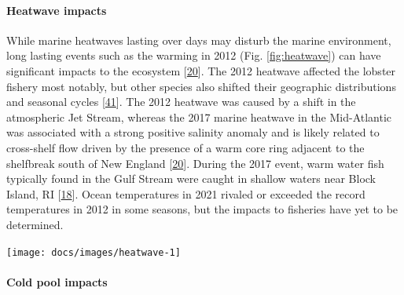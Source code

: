 \documentclass[
  10pt,
]{article}
\let\origfigure\figure
\let\endorigfigure\endfigure
\renewenvironment{figure}[1][2] {
    \expandafter\origfigure\expandafter[H]
} {
    \endorigfigure
}
\begin{document}
\hypertarget{heatwave-impacts}{%
\paragraph{Heatwave impacts}\label{heatwave-impacts}}

While marine heatwaves lasting over days may disturb the marine
environment, long lasting events such as the warming in 2012 (Fig.
\ref{fig:heatwave}) can have significant impacts to the ecosystem
{[}\protect\hyperlink{ref-gawarkiewicz_characteristics_2019}{20}{]}. The
2012 heatwave affected the lobster fishery most notably, but other
species also shifted their geographic distributions and seasonal cycles
{[}\protect\hyperlink{ref-mills_fisheries_2013}{41}{]}. The 2012
heatwave was caused by a shift in the atmospheric Jet Stream, whereas
the 2017 marine heatwave in the Mid-Atlantic was associated with a
strong positive salinity anomaly and is likely related to cross-shelf
flow driven by the presence of a warm core ring adjacent to the
shelfbreak south of New England
{[}\protect\hyperlink{ref-gawarkiewicz_characteristics_2019}{20}{]}.
During the 2017 event, warm water fish typically found in the Gulf
Stream were caught in shallow waters near Block Island, RI
{[}\protect\hyperlink{ref-gawarkiewicz_changing_2018}{18}{]}. Ocean
temperatures in 2021 rivaled or exceeded the record temperatures in 2012
in some seasons, but the impacts to fisheries have yet to be determined.

\begin{figure}

{\centering \texttt{[image: docs/images/heatwave-1]} 

}

\caption{Marine heatwave cumulative intesity (left) and maximum intensity (right) in the Mid-Atlantic Bight.}\label{fig:heatwave}
\end{figure}

\hypertarget{cold-pool-impacts}{%
\paragraph{Cold pool impacts}\label{cold-pool-impacts}}
\end{document}
